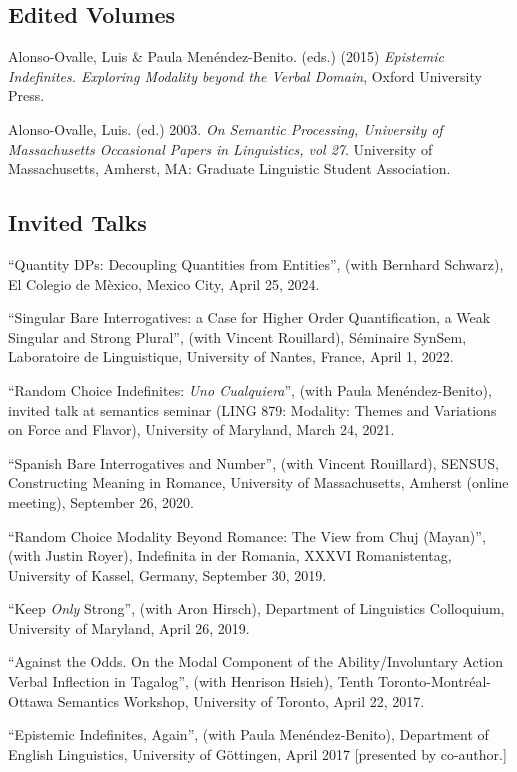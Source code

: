 \documentclass[11pt]{article}
\begin{document}
\subsection*{Edited Volumes}

Alonso-Ovalle, Luis \& Paula Men\'endez-Benito. (eds.) (2015) \emph{Epistemic Indefinites. Exploring Modality beyond the Verbal Domain}, Oxford University Press.

Alonso-Ovalle, Luis. (ed.) 2003. \emph{On Semantic Processing, University of Massachusetts Occasional Papers in Linguistics, vol 27}. University of Massachusetts, Amherst, MA: Graduate Linguistic Student Association.


\subsection*{Invited Talks}

``Quantity DPs: Decoupling Quantities from Entities'', (with Bernhard Schwarz), El Colegio de M\`exico, Mexico City, April 25, 2024.

``Singular Bare Interrogatives: a Case for Higher Order Quantification, a Weak Singular and Strong Plural'', (with Vincent Rouillard), S\'eminaire SynSem, Laboratoire de Linguistique, University of Nantes, France, April 1, 2022.

``Random Choice Indefinites: \textit{Uno Cualquiera}'', (with Paula Men\'endez-Benito), invited talk at semantics seminar (LING 879: Modality: Themes and Variations on Force and Flavor), University of Maryland, March 24, 2021.

``Spanish Bare Interrogatives and Number'', (with Vincent Rouillard), SENSUS, Constructing Meaning in Romance, University of Massachusetts, Amherst (online meeting), September 26, 2020.

``Random Choice Modality Beyond Romance: The View from Chuj (Mayan)'', (with Justin Royer), Indefinita in der Romania, XXXVI Romanistentag, University of Kassel, Germany, September 30, 2019.

``Keep \textit{Only} Strong'', (with Aron Hirsch), Department of Linguistics Colloquium, University of Maryland, April 26, 2019.

``Against the Odds. On the Modal Component of the Ability/Involuntary Action Verbal Inflection in Tagalog'', (with Henrison Hsieh), Tenth Toronto-Montr\'eal-Ottawa Semantics Workshop, University of
Toronto, April 22, 2017.

``Epistemic Indefinites, Again'', (with Paula Men\'endez-Benito), Department of English Linguistics, University of G\"{o}ttingen, April 2017 [presented by co-author.]
\end{document}
